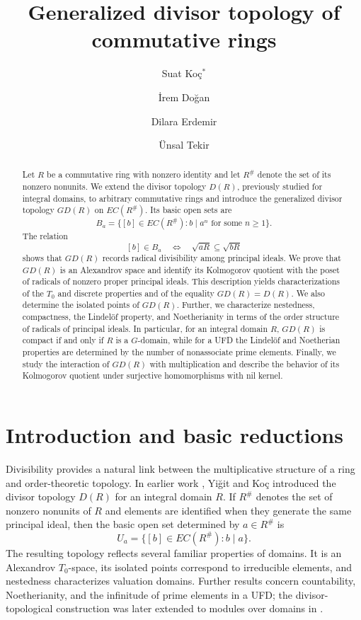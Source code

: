 \documentclass[11pt]{amsart}
\title[Generalized divisor topology of commutative rings]
{Generalized divisor topology of commutative rings}
\author[Koç]{Suat Koç$^{*}$}
\author[Doğan]{İrem Doğan}
\author[Erdemir]{Dilara Erdemir}
\author[Tekir]{Ünsal Tekir}
\theoremstyle{plain}
\theoremstyle{definition}
\theoremstyle{remark}
\numberwithin{equation}{section}
\begin{document}
\begin{abstract}
	Let $R$ be a commutative ring with nonzero identity and let $R^\#$
	denote the set of its nonzero nonunits. We extend the divisor topology
	$D(R)$, previously studied for integral domains, to arbitrary commutative
	rings and introduce the generalized divisor topology $GD(R)$ on
	$EC(R^\#)$. Its basic open sets are
	\[
	B_a=\{[b]\in EC(R^\#): b\mid a^n
	\text{ for some }n\geq 1\}.
	\]
	The relation
	\[
	[b]\in B_a
	\quad\Longleftrightarrow\quad
	\sqrt{aR}\subseteq\sqrt{bR}
	\]
	shows that $GD(R)$ records radical divisibility among principal ideals.
	We prove that $GD(R)$ is an Alexandrov space and identify its Kolmogorov
	quotient with the poset of radicals of nonzero proper principal ideals.
	This description yields characterizations of the $T_0$ and discrete
	properties and of the equality $GD(R)=D(R)$. We also determine the
	isolated points of $GD(R)$. Further, we characterize nestedness,
	compactness, the Lindel\"of property, and Noetherianity in terms of the
	order structure of radicals of principal ideals. In particular, for an
	integral domain $R$, $GD(R)$ is compact if and only if $R$ is a
	$G$-domain, while for a UFD the Lindel\"of and Noetherian properties are
	determined by the number of nonassociate prime elements. Finally, we study the interaction of $GD(R)$ with multiplication and
	describe the behavior of its Kolmogorov quotient under surjective
	homomorphisms with nil kernel.
\end{abstract}

\maketitle

\section{Introduction and basic reductions}

Divisibility provides a natural link between the multiplicative structure of a
ring and order-theoretic topology. In earlier work \cite{YigitKoc}, Yi\u{g}it and Ko\c{c}
introduced the divisor topology $D(R)$ for an integral domain $R$. If $R^\#$
denotes the set of nonzero nonunits of $R$ and elements are identified when
they generate the same principal ideal, then the basic open set determined by
$a\in R^\#$ is
\[
U_a=\{[b]\in EC(R^\#): b\mid a\}.
\]
The resulting topology reflects several familiar properties of domains. It is
an Alexandrov $T_0$-space, its isolated points correspond to irreducible
elements, and nestedness characterizes valuation domains. Further results concern countability, Noetherianity, and the infinitude
of prime elements in a UFD; the divisor-topological construction was
later extended to modules over domains in
\cite{divisortopologyofmodules}.
\end{document}
